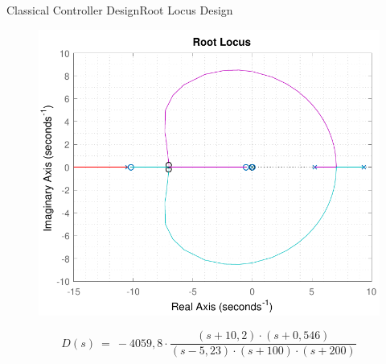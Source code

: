 \begin{frame}{Classical Controller Design}{Root Locus Design}
\begin{figure}
	\includegraphics[scale=.55]{Pictures/RLController}
	\centering
\end{figure}	
%
\pause
%
\begin{displaymath}
	\si{D(s)\ =\ -4059,8 \cdot \frac{(s + 10,2)\cdot (s + 0,546)}{(s - 5,23) \cdot (s + 100) \cdot (s + 200)}} \nonumber
\end{displaymath}
\end{frame}


